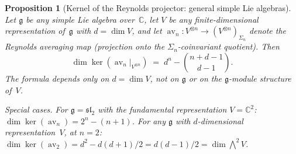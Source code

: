 \documentclass[11pt,reqno]{amsart}
\newtheorem{proposition}[theorem]{Proposition}
\theoremstyle{definition}
\theoremstyle{remark}
\DeclareMathOperator{\av}{av}
\newcommand{\fg}{\mathfrak{g}}
\newcommand{\CC}{\mathbb{C}}
\numberwithin{equation}{section}
\begin{document}
\begin{proposition}[Kernel of the Reynolds projector:
general simple Lie algebras]
\label{prop:ker-av-schur-weyl}
Let $\fg$ be any simple Lie algebra over~$\CC$, let
$V$ be any finite-dimensional representation of~$\fg$ with
$d = \dim V$, and let
$\av_n \colon V^{\otimes n} \to (V^{\otimes n})_{\Sigma_n}$
denote the Reynolds averaging map (projection onto the
$\Sigma_n$-coinvariant quotient).
Then
\begin{equation}\label{eq:ker-av-schur-weyl}
  \dim \ker(\av_n\big|_{V^{\otimes n}})
  \;=\;
  d^n - \binom{n+d-1}{d-1}.
\end{equation}
The formula depends only on $d = \dim V$, not on $\fg$ or
on the $\fg$-module structure of~$V$.

\smallskip
\noindent\textit{Special cases.}
For $\fg = \mathfrak{sl}_2$ with the fundamental
representation $V = \CC^2$:
$\dim\ker(\av_n) = 2^n - (n+1)$.
For any $\fg$ with $d$-dimensional representation~$V$,
at $n = 2$:
$\dim\ker(\av_2) = d^2 - d(d{+}1)/2 = d(d{-}1)/2
= \dim\bigwedge^2 V$.
\end{proposition}
\end{document}
